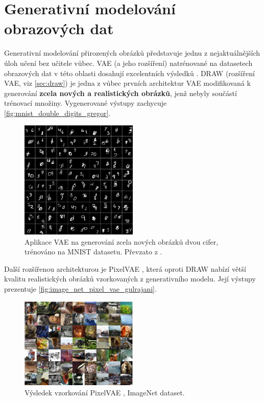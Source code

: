 \section{Generativní modelování obrazových dat}
\label{sec:applications_generative_modeling}
Generativní modelování přirozených obrázků představuje jednu z nejaktuálnějších úloh učení bez učitele vůbec.
VAE (a jeho rozšíření) natrénované na datasetech obrazových dat v této oblasti dosahují excelentních výsledků \cite{Gulrajani2016}.
DRAW (rozšíření VAE, viz \autoref{sec:draw}) je jedna z vůbec prvních architektur VAE modifikovaná k generování \textbf{zcela nových a realistických obrázků}, jenž nebyly součástí trénovací množiny.
Vygenerované výstupy zachycuje \autoref{fig:mnist_double_digits_gregor}.

\begin{figure}[H]
    \centering
    \includegraphics[width=0.5\textwidth]{figures/applications/mnist_double_digits_gregor.png}
    \caption{Aplikace VAE na generování zcela nových obrázků dvou cifer, trénováno na MNIST datasetu. Převzato z \textcite{Gregor2015}.}
    \label{fig:mnist_double_digits_gregor}
\end{figure}

Další rozšířenou architekturou je PixelVAE \cite{Gulrajani2016}, která oproti DRAW nabízí větší kvalitu realistických obrázků vzorkovaných z generativního modelu.
Její výstupy prezentuje \autoref{fig:image_net_pixel_vae_gulrajani}.

\begin{figure}[H]
    \centering
    \includegraphics[width=0.5\textwidth]{figures/applications/image_net_pixel_vae_gulrajani.png}
    \caption{Výsledek vzorkování PixelVAE \cite{Gulrajani2016}, ImageNet dataset.}
    \label{fig:image_net_pixel_vae_gulrajani}
\end{figure}

